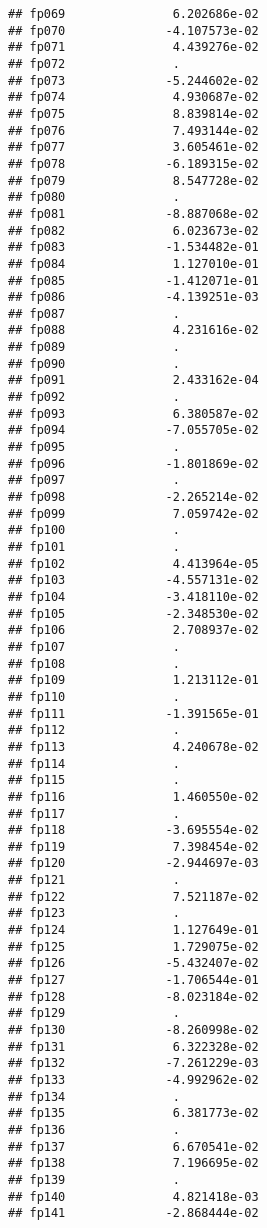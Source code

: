 \documentclass[]{article}
\begin{document}
\begin{verbatim}
## fp069               6.202686e-02
## fp070              -4.107573e-02
## fp071               4.439276e-02
## fp072               .           
## fp073              -5.244602e-02
## fp074               4.930687e-02
## fp075               8.839814e-02
## fp076               7.493144e-02
## fp077               3.605461e-02
## fp078              -6.189315e-02
## fp079               8.547728e-02
## fp080               .           
## fp081              -8.887068e-02
## fp082               6.023673e-02
## fp083              -1.534482e-01
## fp084               1.127010e-01
## fp085              -1.412071e-01
## fp086              -4.139251e-03
## fp087               .           
## fp088               4.231616e-02
## fp089               .           
## fp090               .           
## fp091               2.433162e-04
## fp092               .           
## fp093               6.380587e-02
## fp094              -7.055705e-02
## fp095               .           
## fp096              -1.801869e-02
## fp097               .           
## fp098              -2.265214e-02
## fp099               7.059742e-02
## fp100               .           
## fp101               .           
## fp102               4.413964e-05
## fp103              -4.557131e-02
## fp104              -3.418110e-02
## fp105              -2.348530e-02
## fp106               2.708937e-02
## fp107               .           
## fp108               .           
## fp109               1.213112e-01
## fp110               .           
## fp111              -1.391565e-01
## fp112               .           
## fp113               4.240678e-02
## fp114               .           
## fp115               .           
## fp116               1.460550e-02
## fp117               .           
## fp118              -3.695554e-02
## fp119               7.398454e-02
## fp120              -2.944697e-03
## fp121               .           
## fp122               7.521187e-02
## fp123               .           
## fp124               1.127649e-01
## fp125               1.729075e-02
## fp126              -5.432407e-02
## fp127              -1.706544e-01
## fp128              -8.023184e-02
## fp129               .           
## fp130              -8.260998e-02
## fp131               6.322328e-02
## fp132              -7.261229e-03
## fp133              -4.992962e-02
## fp134               .           
## fp135               6.381773e-02
## fp136               .           
## fp137               6.670541e-02
## fp138               7.196695e-02
## fp139               .           
## fp140               4.821418e-03
## fp141              -2.868444e-02

\end{verbatim}
\end{document}

